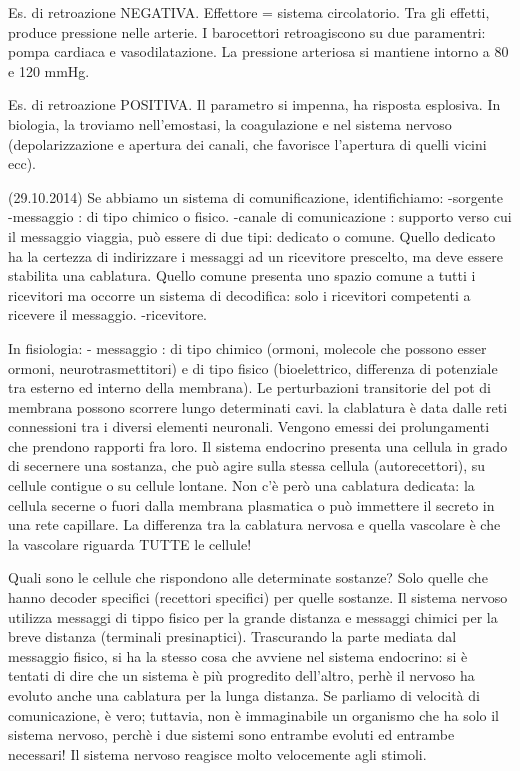 \documentclass[a4paper,12pt]{article}
\begin{document}
Es. di retroazione NEGATIVA.
Effettore = sistema circolatorio. Tra gli effetti, produce pressione nelle arterie. I barocettori retroagiscono su due paramentri: pompa cardiaca e vasodilatazione. 
La pressione arteriosa si mantiene intorno a 80 e 120 mmHg.

Es. di retroazione POSITIVA.
Il parametro si impenna, ha risposta esplosiva. In biologia, la troviamo nell'emostasi, la coagulazione e nel sistema nervoso (depolarizzazione e apertura dei canali, che favorisce l'apertura di quelli vicini ecc). 

(29.10.2014)
Se abbiamo un sistema di comunificazione, identifichiamo:
-sorgente
-messaggio : di tipo chimico o fisico.
-canale di comunicazione : supporto verso cui il messaggio viaggia, può essere di due tipi: dedicato o comune. Quello dedicato ha la certezza di indirizzare i messaggi ad un ricevitore prescelto, ma deve essere stabilita una cablatura. Quello comune presenta uno spazio comune a tutti i ricevitori ma occorre un sistema di decodifica: solo i ricevitori competenti a ricevere il messaggio.
-ricevitore.

In fisiologia:
- messaggio : di tipo chimico (ormoni, molecole che possono esser ormoni, neurotrasmettitori) e di tipo fisico (bioelettrico, differenza di potenziale tra esterno ed interno della membrana). Le perturbazioni transitorie del pot di membrana possono scorrere lungo determinati cavi. la clablatura è data dalle reti connessioni tra i diversi elementi neuronali. Vengono emessi dei prolungamenti che prendono rapporti fra loro.
Il sistema endocrino presenta una cellula in grado di secernere una sostanza, che può agire sulla stessa cellula (autorecettori), su cellule contigue o su cellule lontane. Non c'è però una cablatura dedicata: la cellula secerne o fuori dalla membrana plasmatica o può immettere il secreto in una rete capillare. La differenza tra la cablatura nervosa e quella vascolare è che la vascolare riguarda TUTTE le cellule!

Quali sono le cellule che rispondono alle determinate sostanze?
Solo quelle che hanno decoder specifici (recettori specifici) per quelle sostanze. Il sistema nervoso utilizza messaggi di tippo fisico per la grande distanza e messaggi chimici per la breve distanza (terminali presinaptici).
Trascurando la parte mediata dal messaggio fisico, si ha la stesso cosa che avviene nel sistema endocrino: si è tentati di dire che un sistema è più progredito dell'altro, perhè il nervoso ha evoluto anche una cablatura per la lunga distanza. 
Se parliamo di velocità di comunicazione, è vero; tuttavia, non è immaginabile un organismo che ha solo il sistema nervoso, perchè i due sistemi sono entrambe evoluti ed entrambe necessari!
Il sistema nervoso reagisce molto velocemente agli stimoli.
\end{document}

